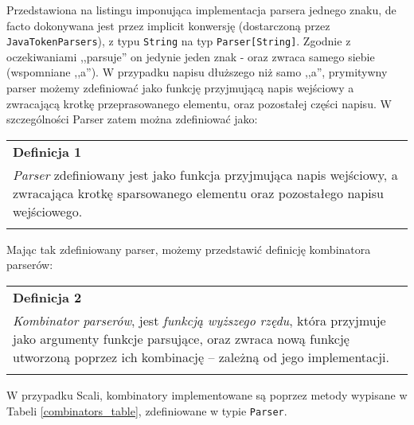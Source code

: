 Przedstawiona na listingu imponująca implementacja parsera jednego znaku, de facto dokonywana jest przez implicit konwersję (dostarczoną przez \verb|JavaTokenParsers|), 
z typu \verb|String| na typ \verb|Parser[String]|. Zgodnie z oczekiwaniami ,,parsuje'' on jedynie jeden znak - oraz zwraca samego siebie (wspomniane ,,a'').
W przypadku napisu dłuższego niż samo ,,a'', prymitywny parser możemy zdefiniować jako funkcję przyjmującą napis wejściowy a zwracającą krotkę 
przeprasowanego elementu, oraz pozostałej części napisu. W szczególności Parser zatem można zdefiniować jako:

\begin{center}
\begin{tabular}{|p{\textwidth}|}
\hline
\textbf{Definicja 1} \\
\textit{Parser} zdefiniowany jest jako funkcja przyjmująca napis wejściowy, a zwracająca krotkę sparsowanego elementu oraz pozostałego napisu wejściowego. \\ 
\cite{monadparsing}
\\ \hline
\end{tabular}
\end{center}

Mając tak zdefiniowany parser, możemy przedstawić definicję kombinatora parserów:

\begin{center}
\begin{tabular}{|p{\textwidth}|}
\hline
\textbf{Definicja 2} \\
\textit{Kombinator parserów}, jest \textit{funkcją wyższego rzędu},
która przyjmuje jako argumenty funkcje parsujące, oraz zwraca nową funkcję utworzoną poprzez ich kombinację -- zależną od jego implementacji. \\

\cite{monadparsing}
\\ \hline
\end{tabular}
\end{center}

W przypadku Scali, kombinatory implementowane są poprzez metody wypisane w Tabeli \ref{combinators_table}, zdefiniowane w typie \verb|Parser|.


